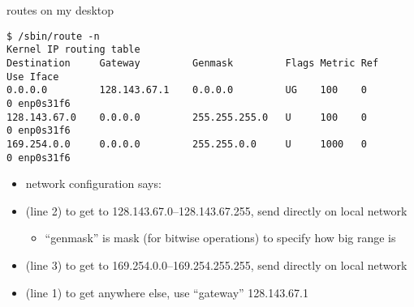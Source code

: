 \begin{frame}[fragile]{routes on my desktop}
\begin{Verbatim}[fontsize=\fontsize{9}{10}\selectfont]
$ /sbin/route -n
Kernel IP routing table
Destination     Gateway         Genmask         Flags Metric Ref    Use Iface
0.0.0.0         128.143.67.1    0.0.0.0         UG    100    0        0 enp0s31f6
128.143.67.0    0.0.0.0         255.255.255.0   U     100    0        0 enp0s31f6
169.254.0.0     0.0.0.0         255.255.0.0     U     1000   0        0 enp0s31f6
\end{Verbatim}
\begin{itemize}
\item network configuration says:
\vspace{.5cm}
\item (line 2) to get to 128.143.67.0--128.143.67.255, send directly on local network
    \begin{itemize}
    \item ``genmask'' is mask (for bitwise operations) to specify how big range is
    \end{itemize}
\item (line 3) to get to 169.254.0.0--169.254.255.255, send directly on local network
\item (line 1) to get anywhere else, use ``gateway'' 128.143.67.1
\end{itemize}
\end{frame}

